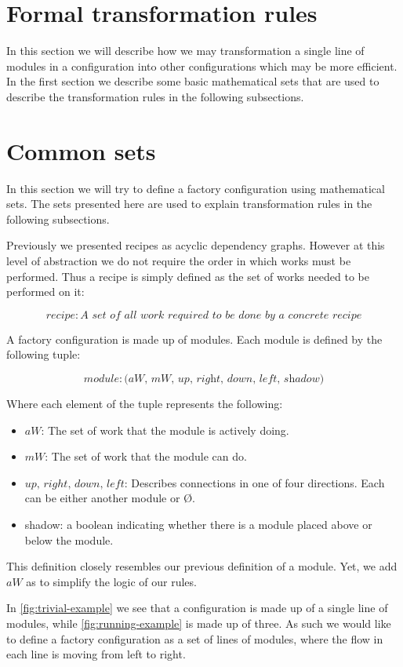\section{Formal transformation rules}
In this section we will describe how we may transformation a single line of modules in a configuration into other configurations which may be more efficient. In the first section we describe some basic mathematical sets that are used to describe the transformation rules in the following subsections.

\section{Common sets} 
In this section we will try to define a factory configuration using mathematical sets. The sets presented here are used to explain transformation rules in the following subsections.

Previously we presented recipes as acyclic dependency graphs. However at this level of abstraction we do not require the order in which works must be performed. Thus a recipe is simply defined as the set of works needed to be performed on it: 

\[recipe: \textit{A set of all work required to be done by a concrete recipe}\]

A factory configuration is made up of modules. Each module is defined by the following tuple:

\[module: \textit{(aW, mW, up, right, down, left, shadow)}\]

\noindent Where each element of the tuple represents the following:
\begin{itemize}
\item $aW$: The set of work that the module is actively doing.
\item $mW$: The set of work that the module can do.
\item $up,\, right,\, down,\, left$: Describes connections in one of four directions. Each can be either another module or Ø.
\item shadow: a boolean indicating whether there is a module placed above or below the module.
\end{itemize}

This definition closely resembles our previous definition of a module. Yet, we add $aW$ as to simplify the logic of our rules. 


In \cref{fig:trivial-example} we see that a configuration is made up of a single line of modules, while \cref{fig:running-example} is made up of three. As such we would like to define a factory configuration as a set of lines of modules, where the flow in each line is moving from left to right.

